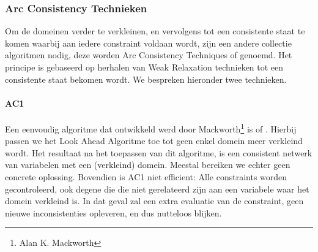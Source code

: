 \subsubsection{Arc Consistency Technieken}
Om de domeinen verder te verkleinen, en vervolgens tot een consistente staat te komen waarbij aan iedere constraint voldaan wordt, zijn een andere collectie algoritmen nodig, deze worden Arc Consistency Techniques of  genoemd. Het principe is gebaseerd op herhalen van Weak Relaxation technieken tot een consistente staat bekomen wordt. We bespreken hieronder twee technieken.
\paragraph{AC1} Een eenvoudig algoritme dat ontwikkeld werd door Mackworth\footnote{Alan K. Mackworth} is  of . Hierbij passen we het Look Ahead Algoritme toe tot geen enkel domein meer verkleind wordt. Het resultaat na het toepassen van dit algoritme, is een consistent netwerk van variabelen met een (verkleind) domein. Meestal bereiken we echter geen concrete oplossing. Bovendien is AC1 niet efficient: Alle constraints worden gecontroleerd, ook degene die die niet gerelateerd zijn aan een variabele waar het domein verkleind is. In dat geval zal een extra evaluatie van de constraint, geen nieuwe inconsistenties opleveren, en dus nutteloos blijken.
